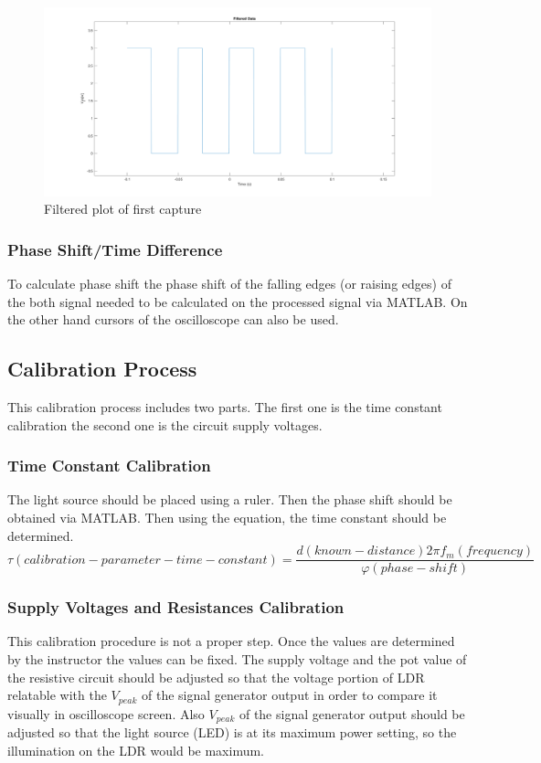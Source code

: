 \documentclass[letterpaper,12pt]{article}
\begin{document}
\begin{figure}[H]
	\centering
   \includegraphics[width=1\textwidth]{filtered_data_plot.png}
   \caption{Filtered plot of first capture}
\end{figure} 
\subsubsection{Phase Shift/Time Difference}
To calculate phase shift the phase shift of the falling edges (or raising edges) of the both signal needed to be calculated on the processed signal via MATLAB. On the other hand cursors of the oscilloscope can also be used.
\subsection{Calibration Process}
This calibration process includes two parts. The first one is the time constant calibration the second one is the circuit supply voltages. 
\subsubsection{Time Constant Calibration}
The light source should be placed using a ruler. Then the phase shift should be obtained via MATLAB. Then using the equation, the time constant should be determined.
\[ \tau (calibration-parameter-time-constant)  = \frac{ d(known-distance) 2 \pi f_m (frequency)   }{ \varphi (phase-shift)}\]

\subsubsection{Supply Voltages and Resistances Calibration}
This calibration procedure is not a proper step. Once the values are determined by the instructor the values can be fixed. The supply voltage and the pot value of the resistive circuit should be adjusted so that the voltage portion of LDR relatable with the \(V_{peak}\) of the signal generator output  in order to compare it visually in oscilloscope screen. Also  \(V_{peak}\) of the signal generator output should be adjusted so that the light source (LED) is at its maximum power setting, so the illumination on the LDR would be maximum. 
\end{document}
